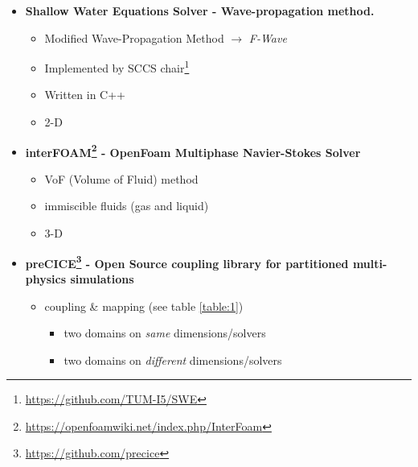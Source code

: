 
\begin{frame}
 	
\begin{multicols}{2}
\begin{itemize}
 \setlength\itemsep{10pt}

\item<2->[]
\textbf{Shallow Water Equations Solver - Wave-propagation method.}
\begin{itemize}
\vspace{5pt}
 \setlength\itemsep{6pt}
\item Modified Wave-Propagation Method $\rightarrow$ \textit{F-Wave} \cite{levequeArticle}
\item Implemented by SCCS chair\footnote{\url{https://github.com/TUM-I5/SWE}}
\item Written in C++
\item 2-D
\end{itemize}

\item<3->[]
\textbf{interFOAM\footnote{\url{https://openfoamwiki.net/index.php/InterFoam}} - OpenFoam Multiphase Navier-Stokes Solver}
\begin{itemize}
\vspace{5pt}
 \setlength\itemsep{6pt}
\item VoF (Volume of Fluid) method
\item immiscible fluids (gas and liquid)
\item 3-D
\end{itemize}

\vfill\columnbreak
\item<4->[]
\textbf{preCICE\footnote{\url{https://github.com/precice}} - Open Source coupling library for partitioned multi-physics simulations}
\begin{itemize}
\vspace{5pt}
\item coupling \& mapping {\tiny (see table \ref{table:1})}
\begin{itemize}
\item two domains on \textit{same} dimensions/solvers
\item two domains on \textit{different} dimensions/solvers
\end{itemize}
\end{itemize}
\end{itemize}

\end{multicols}

\end{frame}

